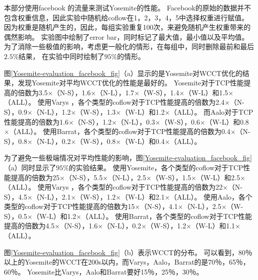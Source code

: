 本部分使用facebook \cite{chowdhury2014efficient}的流量来测试Yosemite的性能。
Facebook的原始的数据并不包含权重信息，因此实验中随机给coflow在1，2，3，4，5中选择权重进行赋值。
因为权重是随机产生的，因此，每组实验重复100次，来避免随机产生权重带来的偶然影响。
实验图中绘制了error bar，同时标记了最大值，最小值以及平均值。
为了消除一些极值的影响，考虑更一般化的情形，在每组中，同时删除最前和最后$2.5\%$结果，
在实验中同时绘制了$95\%$的情形。

图\ref{Yosemite-evaluation_facebook_fig}（a）显示的是Yosemite对WCCT优化的结果，发现Yosemite对平均WCCT优化的性能是最好的。
Yosemite对于TCP性能提高的倍数为3.5$\times$（N-S），1.6$\times$（N-L），1.7$\times$（W-S），1.4$\times$（W-L）和1.5$\times$（ALL）。
使用Varys ，各个类型的coflow对于TCP性能提高的倍数为2.4$\times$（N-S），0.9$\times$（N-L），1.2$\times$（W-S），1.3$\times$（W-L）和1.2$\times$（ALL）。
而Aalo对于TCP性能提高的倍数为1.6$\times$（N-S），1.2$\times$（N-L），0.3$\times$（W-S），0.6$\times$（W-L）和0.8$\times$（ALL）。
使用Barrat，各个类型的coflow对于TCP性能提高的倍数为0.4$\times$（N-S），0.8$\times$（N-L），0.2$\times$（W-S），0.8$\times$（W-L）和0.4$\times$（ALL）。

为了避免一些极端情况对平均性能的影响，图\ref{Yosemite-evaluation_facebook_fig}（a）同时显示了$95\%$的实验结果。
使用Yosemite，各个类型的coflow对于TCP性能提高的倍数为25$\times$（N-S），5.5$\times$（N-L），2.5$\times$（W-S），1.5$\times$（W-L）和2.5$\times$（ALL）。
使用Varys ，各个类型的coflow对于TCP性能提高的倍数为22$\times$（N-S），4.5$\times$（N-L），2.1$\times$（W-S），1.2$\times$（W-L）和2.1$\times$（ALL）。
使用Aalo，各个类型的coflow对于TCP性能提高的倍数为15$\times$（N-S），4.1$\times$（N-L），2.5$\times$（W-S），0.5$\times$（W-L）和1.2$\times$（ALL）。
使用Barrat，各个类型的coflow对于TCP性能提高的倍数为4.5$\times$（N-S），1.6$\times$（N-L），0.2$\times$（W-S），1.2$\times$（W-L）和1.1$\times$（ALL）。


图\ref{Yosemite-evaluation_facebook_fig}（b）表示WCCT的分布。
可以看到，80％以上的Yosemite的WCCT在200s以内，而Varys，Aalo，Barrat的是70％，65％，60％。
Yosemite比Varys，Aalo和Barrat要好15％，25％，30％。


